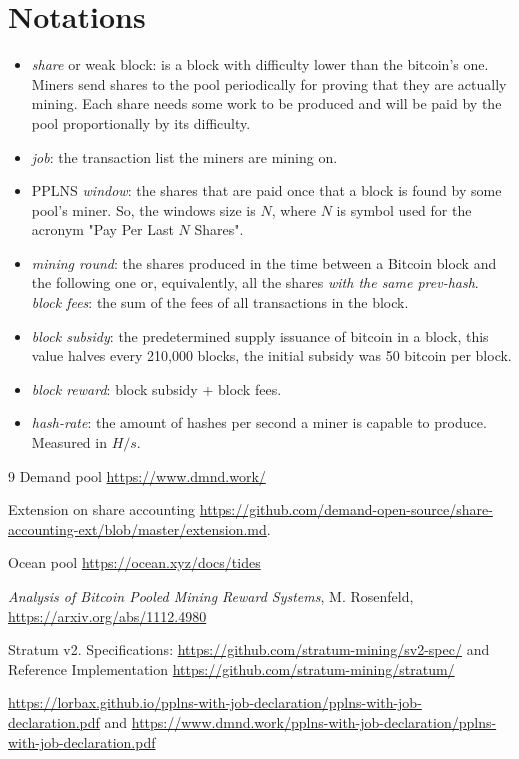 \documentclass[10pt]{article}
\begin{document}
\section{Notations}
\begin{itemize} 
	\item \emph{share} or weak block: is a block with difficulty lower than the bitcoin's one. Miners send shares to the pool periodically for proving that they are actually mining. Each share needs some work to be produced and will be paid by the pool proportionally by its difficulty.
	\item \emph{job}: the transaction list the miners are mining on.
	\item PPLNS \emph{window}: the shares that are paid once that a block is found by some pool's miner. So, the windows size is $N$, where $N$ is symbol used for the acronym "Pay Per Last $N$ Shares".
	\item \emph{mining round}: the shares produced in the time between a Bitcoin block and the following one or, equivalently, all the shares \emph{with the same prev-hash}.
	\emph \emph{block fees}: the sum of the fees of all transactions in the block. 
	\item \emph{block subsidy}: the predetermined supply issuance of bitcoin in a block, this value halves every 210,000 blocks, the initial subsidy was 50 bitcoin per block.
	\item \emph{block reward}: block subsidy + block fees.
	\item \emph{hash-rate}: the amount of hashes per second a miner is capable to produce. Measured in $H/s$.
\end{itemize}

\begin{thebibliography}{9}
Demand pool \url{https://www.dmnd.work/}

Extension on share accounting
\url{https://github.com/demand-open-source/share-accounting-ext/blob/master/extension.md}.
	
Ocean pool \url{https://ocean.xyz/docs/tides}

\emph{Analysis of Bitcoin Pooled Mining Reward Systems}, M. Rosenfeld, \url{https://arxiv.org/abs/1112.4980}

Stratum v2. Specifications: \url{https://github.com/stratum-mining/sv2-spec/} and Reference Implementation \url{https://github.com/stratum-mining/stratum/}

\url{https://lorbax.github.io/pplns-with-job-declaration/pplns-with-job-declaration.pdf} and \url{https://www.dmnd.work/pplns-with-job-declaration/pplns-with-job-declaration.pdf}
\end{thebibliography}
\end{document}
